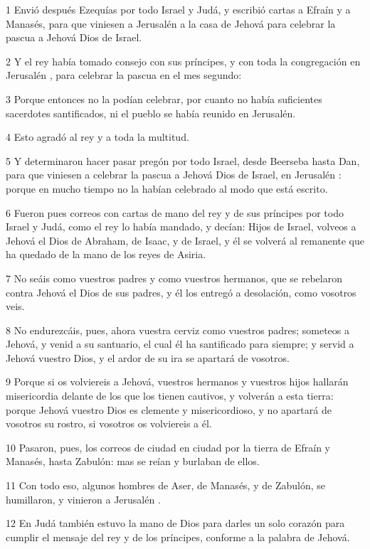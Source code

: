 \par 1 Envió después Ezequías por todo Israel y Judá, y escribió cartas a Efraín y a Manasés, para que viniesen a Jerusalén  a la casa de Jehová para celebrar la pascua a Jehová Dios de Israel.
\par 2 Y el rey había tomado consejo con sus príncipes, y con toda la congregación en Jerusalén , para celebrar la pascua en el mes segundo:
\par 3 Porque entonces no la podían celebrar, por cuanto no había suficientes sacerdotes santificados, ni el pueblo se había reunido en Jerusalén. 
\par 4 Esto agradó al rey y a toda la multitud.
\par 5 Y determinaron hacer pasar pregón por todo Israel, desde Beerseba hasta Dan, para que viniesen a celebrar la pascua a Jehová Dios de Israel, en Jerusalén : porque en mucho tiempo no la habían celebrado al modo que está escrito.
\par 6 Fueron pues correos con cartas de mano del rey y de sus príncipes por todo Israel y Judá, como el rey lo había mandado, y decían: Hijos de Israel, volveos a Jehová el Dios de Abraham, de Isaac, y de Israel, y él se volverá al remanente que ha quedado de la mano de los reyes de Asiria.
\par 7 No seáis como vuestros padres y como vuestros hermanos, que se rebelaron contra Jehová el Dios de sus padres, y él los entregó a desolación, como vosotros veis.
\par 8 No endurezcáis, pues, ahora vuestra cerviz como vuestros padres; someteos a Jehová, y venid a su santuario, el cual él ha santificado para siempre; y servid a Jehová vuestro Dios, y el ardor de su ira se apartará de vosotros.
\par 9 Porque si os volviereis a Jehová, vuestros hermanos y vuestros hijos hallarán misericordia delante de los que los tienen cautivos, y volverán a esta tierra: porque Jehová vuestro Dios es clemente y misericordioso, y no apartará de vosotros su rostro, si vosotros os volviereis a él.
\par 10 Pasaron, pues, los correos de ciudad en ciudad por la tierra de Efraín y Manasés, hasta Zabulón: mas se reían y burlaban de ellos.
\par 11 Con todo eso, algunos hombres de Aser, de Manasés, y de Zabulón, se humillaron, y vinieron a Jerusalén .
\par 12 En Judá también estuvo la mano de Dios para darles un solo corazón para cumplir el mensaje del rey y de los príncipes, conforme a la palabra de Jehová.
